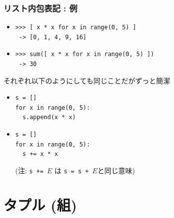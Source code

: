 \documentclass[10pt,dvipdfmx]{beamer}
\begin{document}
\begin{frame}[fragile]
\frametitle{リスト内包表記 : 例}
\begin{itemize}
\item 
\begin{lstlisting}
>>> [ x * x for x in range(0, 5) ]
 -> [0, 1, 4, 9, 16]
\end{lstlisting}

\item 
\begin{lstlisting}
>>> sum([ x * x for x in range(0, 5) ])
 -> 30
\end{lstlisting}

\end{itemize}

それぞれ以下のようにしても同じことだがずっと簡潔
\begin{itemize}
\item 
\begin{lstlisting}
s = []
for x in range(0, 5):
  s.append(x * x)
\end{lstlisting}

\item 
\begin{lstlisting}
s = []
for x in range(0, 5):
  s += x * x
\end{lstlisting}
(注: {\tt s += $E$} は {\tt s = s + $E$}と同じ意味)

\end{itemize}
\end{frame}


\section{タプル (組)}
\end{document}
